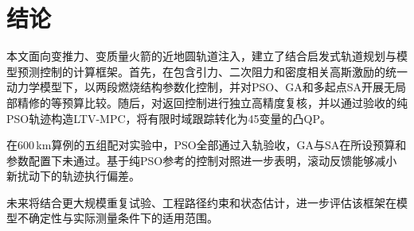 \section{结论}
本文面向变推力、变质量火箭的近地圆轨道注入，建立了结合启发式轨道规划与模型预测控制的计算框架。首先，在包含引力、二次阻力和密度相关高斯激励的统一动力学模型下，以两段燃烧结构参数化控制，并对PSO、GA和多起点SA开展无局部精修的等预算比较。随后，对返回控制进行独立高精度复核，并以通过验收的纯PSO轨迹构造LTV-MPC，将有限时域跟踪转化为45变量的凸QP。

在600\,km算例的五组配对实验中，PSO全部通过入轨验收，GA与SA在所设预算和参数配置下未通过。基于纯PSO参考的控制对照进一步表明，滚动反馈能够减小新扰动下的轨迹执行偏差。

未来将结合更大规模重复试验、工程路径约束和状态估计，进一步评估该框架在模型不确定性与实际测量条件下的适用范围。
